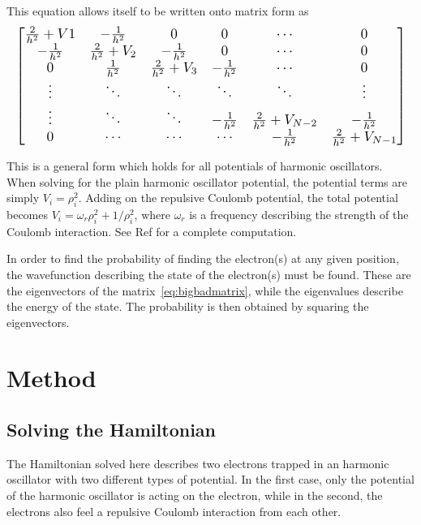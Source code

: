 \documentclass[aps,reprint]{revtex4-1}
\begin{document}
This equation allows itself to be written onto matrix form as
\begin{equation}\resizebox{\columnwidth}{!}{$
  \begin{bmatrix}
    \frac{2}{h^{2}}+V1 & -\frac{1}{h^{2}}      & 0                & 0 & \cdots & 0 \\
    -\frac{1}{h^{2}}   & \frac{2}{h^{2}}+V_{2} & -\frac{1}{h^{2}} & 0  & \cdots & 0 \\
    0 & \frac{1}{h^{2}} & \frac{2}{h^{2}} + V_{3} & -\frac{1}{h^{2}}  &  \cdots & 0 \\
    \vdots & \ddots & \ddots & \ddots & \ddots & \vdots \\
    \vdots & \ddots & \ddots&  -\frac{1}{h^{2}} & \frac{2}{h^{2}}+V_{N-2} & -\frac{1}{h^{2}} \\
    0 & \cdots & \cdots & \cdots & -\frac{1}{h^{2}} & \frac{2}{h^{2}} + V_{N-1} \\
  \end{bmatrix}
  $}\label{eq:bigbadmatrix}
\end{equation}

This is a general form which holds for all potentials of harmonic oscillators.
When solving for the plain harmonic oscillator potential, the potential terms are simply
\(V_{i}=\rho_{i}^{2}\). Adding on the repulsive Coulomb potential, the total potential
becomes \(V_{i}=\omega_{r}\rho_{i}^{2}+1/\rho_{i}^{2}\), where \(\omega_{r}\) is
a frequency describing the strength of the Coulomb interaction. See Ref for a complete computation.

In order to find the probability of finding the electron(s) at any given
position, the wavefunction describing the state of the electron(s) must be
found. These are the eigenvectors of the matrix~\eqref{eq:bigbadmatrix}, while
the eigenvalues describe the energy of the state. The probability is then
obtained by squaring the eigenvectors.
\section{Method}
\label{sec:method}

\subsection{Solving the Hamiltonian}
The Hamiltonian solved here describes two electrons trapped in an harmonic oscillator with
two different types of potential. In the first case, only the potential of the
harmonic oscillator is
acting on the electron, while in the second, the electrons also feel a repulsive Coulomb
interaction from each other.
\end{document}
